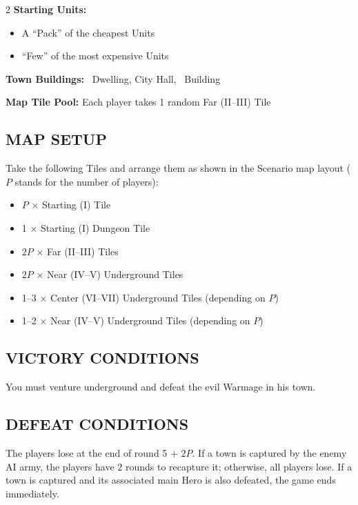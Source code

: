 \begin{multicols*}{2}
\textbf{Starting Units:}
\begin{itemize}
\item A ``Pack'' of the cheapest  Units
\item ``Few'' of the most expensive  Units
\end{itemize}

\textbf{Town Buildings:} ~Dwelling, City Hall, ~Building

\textbf{Map Tile Pool:} Each player takes 1 random Far (II--III) Tile

\subsection*{\MakeUppercase{Map Setup}} Take the following Tiles and arrange them as shown in the Scenario map layout ($P$ stands for the number of players):

\begin{itemize}
\item $P$ × Starting (I) Tile
\item 1 × Starting (I) Dungeon Tile
\item $2P$ × Far (II--III) Tiles
\item $2P$ × Near (IV--V) Underground Tiles
\item 1--3 × Center (VI--VII) Underground Tiles (depending on $P$)
\item 1--2 × Near (IV--V) Underground Tiles (depending on $P$)
\end{itemize}

\subsection*{\MakeUppercase{Victory Conditions}} You must venture underground and defeat the evil Warmage in his town.
\subsection*{\MakeUppercase{Defeat Conditions}} The players lose at the end of round 5 + $2P$. If a town is captured by the enemy AI army, the players have 2 rounds to recapture it; otherwise, all players lose. If a town is captured and its associated main Hero is also defeated, the game ends immediately.


\end{multicols*}
